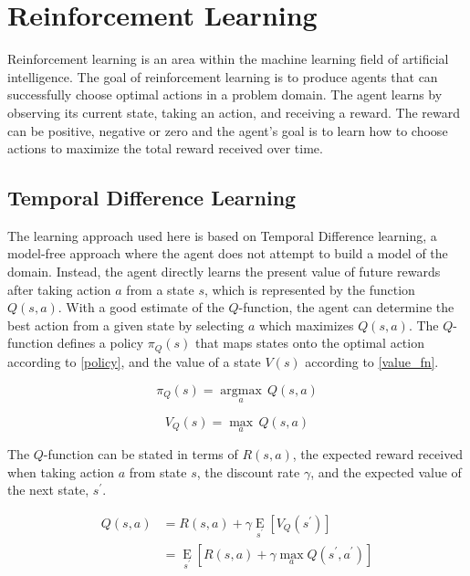 \section{Reinforcement Learning}

Reinforcement learning is an area within the machine learning field of artificial intelligence.  The goal of reinforcement learning is to produce agents that can successfully choose optimal actions in a problem domain.  The agent learns by observing its current state, taking an action, and receiving a reward.  The reward can be positive, negative or zero and the agent’s goal is to learn how to choose actions to maximize the total reward received over time.

\subsection{Temporal Difference Learning}
The learning approach used here is based on Temporal Difference learning, a model-free approach where the agent does not attempt to build a model of the domain.  Instead, the agent directly learns the present value of future rewards after taking action $a$ from a state $s$, which is represented by the function $Q(s,a)$.  With a good estimate of the  $Q$-function, the agent can determine the best action from a given state by selecting $a$ which maximizes $Q(s,a)$.  The  $Q$-function defines a policy $\pi_Q(s)$ that maps states onto the optimal action according to \eqref{policy}, and the value of a state $V(s)$ according to \eqref{value_fn}.

\begin{equation}
\pi_Q(s)={\operatorname*{argmax}_a}\,Q(s,a)\label{policy}
\end{equation}

\begin{equation}
V_Q(s)={\operatorname*{max}_a}\,Q(s,a)\label{value_fn}
\end{equation}

The $Q$-function can be stated in terms of $R(s,a)$, the expected reward received when taking action $a$ from state $s$, the discount rate ${\gamma}$, and the expected value of the next state, $s^\prime$.

\begin{align}
Q(s,a) &= R(s,a)+\gamma {\operatorname*{E}_{s^\prime}}[V_Q(s^\prime)]\label{value_fn} \\
&= {\operatorname*{E}_{s^\prime}}[R(s,a)+\gamma {\operatorname*{max}_a}Q(s^\prime, a^\prime)] \label{exp_rq}
\end{align}

